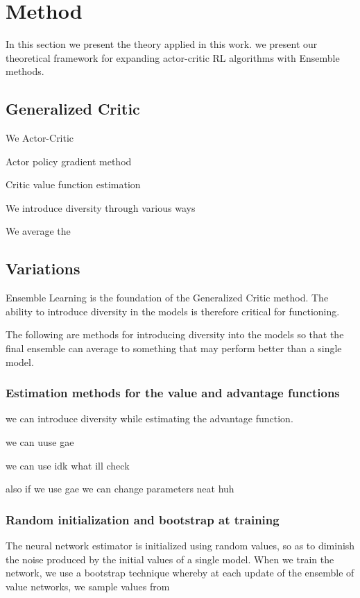 \section{Method}
\label{sec:method}

In this section we present the theory applied in this work. 
we present our theoretical framework for expanding actor-critic RL algorithms with Ensemble methods.

\subsection{Generalized Critic}

We Actor-Critic

Actor  policy gradient method

Critic value function estimation

We introduce diversity through various ways

We average the 

\subsection{Variations}

Ensemble Learning is the foundation of the Generalized Critic method. The ability to introduce diversity in the models is therefore critical for functioning. 

The following are methods for introducing diversity into the models so that the final ensemble can average to something that may perform better than a single model. 

\subsubsection{Estimation methods for the value and advantage functions}

we can introduce diversity while estimating the advantage function.

we can uuse gae

we can use idk what ill check

also if we use gae we can change parameters
neat huh


\subsubsection{Random initialization and bootstrap at training}

The neural network estimator is initialized using random values, so as to diminish the noise produced by the initial values of a single model. When we train the network, we use a bootstrap\cite{efron1982jackknife} technique whereby at each update of the ensemble of value networks, we sample values from

